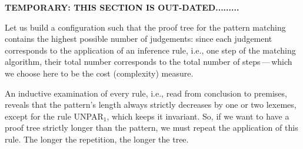 
\textbf{TEMPORARY: THIS SECTION IS OUT-DATED.........}

\medskip

Let us build a configuration such that the proof tree for the pattern
matching contains the highest possible number of judgements: since
each judgement corresponds to the application of an inference rule,
i.e., one step of the matching algorithm, their total number
corresponds to the total number of steps\,---\,which we choose here to
be the cost (complexity) measure.

An inductive examination of every rule, i.e., read from conclusion to
premises, reveals that the pattern's length always strictly decreases
by one or two lexemes, except for the rule \textsf{UNPAR}\(_1\), which
keeps it invariant. So, if we want to have a proof tree strictly
longer than the pattern, we must repeat the application of this
rule. The longer the repetition, the longer the tree.

